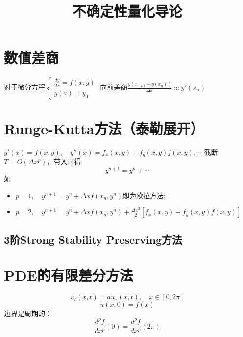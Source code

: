 \documentclass[a4paper,10pt]{article}
\title{\LARGE 不确定性量化导论}
\date{}
\begin{document}
\maketitle
\section{数值差商}
对于微分方程$\begin{cases}
\frac{dy}{dx}=f(x,y)  \\
y(a) = y_0
\end{cases}$
向前差商$\frac{y(x_{n+1}-y(x_{n}))}{\Delta x}\approx y'(x_n)$ 
\section{Runge-Kutta方法（泰勒展开）}
$y'(x)=f(x,y), \quad y''(x)=f_x(x,y)+f_y(x,y)f(x,y),\cdots$
截断$T=O(\Delta x^{p})$，带入可得
$$y^{n+1} = y^{n}+\cdots $$
如
\begin{itemize}
	\item $p=1,\quad y^{n+1}=y^{n}+\Delta x f(x_n,y^{n})$即为欧拉方法;
	\item $p=2,\quad y^{n+1}=y^{n}+\Delta x f(x_n,y^{n})+\frac{\Delta x^{2}}{2}\left[f_x(x,y)+f_y(x,y)f(x,y)\right]$
\end{itemize}
\subsection{3阶Strong Stability Preserving方法}
\section{PDE的有限差分方法}
$$u_t(x,t)=au_x(x,t),\quad x\in [0, 2\pi]
$$$$
u(x,0)=f(x)$$边界是周期的：$$
\frac{d^{p}f}{dx^{p}}(0)=\frac{d^{p}f}{dx^{p}}(2\pi)$$
\end{document}
